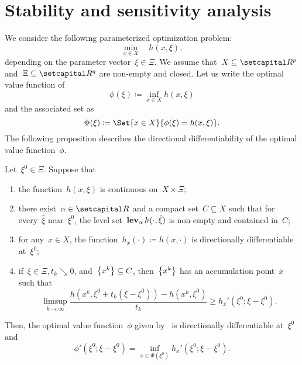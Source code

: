 \documentclass[../main]{subfiles}
\begin{document}
\section{Stability and sensitivity analysis}
We consider the following parameterized optimization problem:
\begin{equation} \label{eq:parameterized}
    \min_{x \in X} \quad h(x, \xi)
,\end{equation} 
depending on the parameter vector~$\xi \in \Xi$.
We assume that~$X \subseteq \setR^p$ and~$\Xi \subseteq \setR^q$ are non-empty and closed.
Let us write the optimal value function of~
\begin{equation} \label{eq:opt_val_fun}
    \phi(\xi) \coloneqq \inf_{x \in X} h(x, \xi)
\end{equation} 
and the associated set as
\begin{equation} \label{eq:opt_sol_map}
    \Phi(\xi) \coloneqq \Set{x \in X}{\phi(\xi) = h(x, \xi)}
.\end{equation} 
The following proposition describes the directional differentiability of the optimal value function~$\phi$.
\begin{proposition} 
    Let~$\xi^0 \in \Xi$.
    Suppose that
    \begin{enumerate}
        \item the function~$h(x, \xi)$ is continuous on~$X \times \Xi$;
        \item there exist~$\alpha \in \setR$ and a compact set~$C \subseteq X$ such that for every~$\hat{\xi}$ near~$\xi^0$, the level set~$\level_\alpha h(\cdot, \hat{\xi})$ is non-empty and contained in~$C$;
        \item for any~$x \in X$, the function~$h_x(\cdot) \coloneqq h(x, \cdot)$ is directionally differentiable at~$\xi^0$;
        \item if~$\xi \in \Xi, t_k \searrow 0$, and~$\set*{x^k} \subseteq C$, then~$\set*{x^k}$ has an accumulation point~$\bar{x}$ such that
            \begin{equation}
                \limsup_{k \to \infty} \frac{h(x^k, \xi^0 + t_k(\xi - \xi^0)) - h(x^k, \xi^0)}{t_k} \ge h_{\bar{x}}'(\xi^0; \xi - \xi^0)
            .\end{equation} 
    \end{enumerate}
    Then, the optimal value function~$\phi$ given by~ is directionally differentiable at~$\xi^0$ and
    \begin{equation}
        \phi'(\xi^0; \xi - \xi^0) = \inf_{x \in \Phi(\xi^0)} h_x'(\xi^0; \xi - \xi^0)
    .\end{equation} 
\end{proposition}
\end{document}
